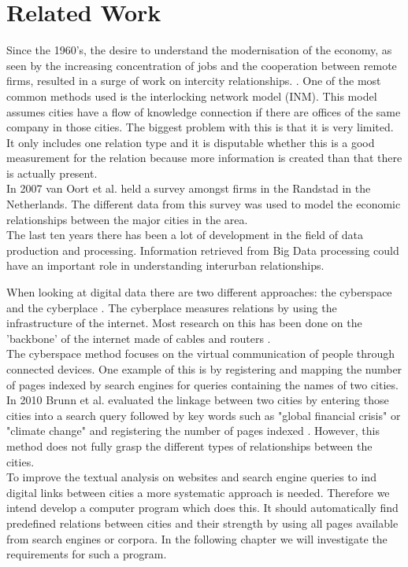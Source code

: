 \section{Related Work}
Since the 1960's, the desire to understand the modernisation of the economy, as seen by the increasing concentration of jobs and the cooperation between remote firms, resulted in a surge of work on intercity relationships. \cite{tornqvist1968flows}.
One of the most common methods used is the interlocking network model (INM)\cite{taylor2012interlocking}. This model assumes cities have a flow of knowledge connection if there are offices of the same company in those cities. The biggest problem with this is that it is very limited. It only includes one relation type and it is disputable whether this is a good measurement for the relation because more information is created than that there is actually present. \\
In 2007 van Oort et al. \cite{van2010economic} held a survey amongst firms in the Randstad in the Netherlands. The different data from this survey was used to model the economic relationships between the major cities in the area. \\

The last ten years there has been a lot of development in the field of data production and processing. Information retrieved from Big Data processing could have an important role in understanding interurban relationships.

When looking at digital data there are two different approaches: the cyberspace and the cyberplace \cite{devriendt2008cyberplace}. The cyberplace measures relations by using the infrastructure of the internet. Most research on this has been done on the 'backbone' of the internet made of cables and routers \cite{choi2006comparing, gorman2000networks}. \\

The cyberspace method focuses on the virtual communication of people through connected devices. One example of this is by registering and mapping the number of pages indexed by search engines for queries containing the names of two cities\cite{devriendt2008cyberplace, janc2015visibility, janc2015geography}. In 2010 Brunn et al. evaluated the linkage between two cities by entering those cities into a search query followed by key words such as "global financial crisis" or "climate change" and registering the number of pages indexed \cite{brunn2010networks}. However, this method does not fully grasp the different types of relationships between the cities. \\

To improve the textual analysis on websites and search engine queries to ind digital links between cities a more systematic approach is needed.  Therefore we intend develop a computer program which does this. It should automatically find predefined relations between cities and their strength by using all pages available from search engines or corpora. In the following chapter we will investigate the requirements for such a program.
